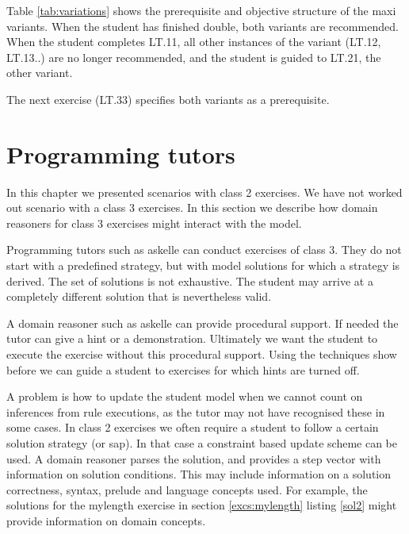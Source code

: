 Table \ref{tab:variations} shows the prerequisite and objective structure of the maxi variants.
When the student has finished double, both variants are recommended.
When the student completes LT.11, all other instances of the variant (LT.12, LT.13..) 
are no longer recommended, and the student is guided to LT.21, the other variant.

The next exercise (LT.33) specifies both variants as a prerequisite.




\section{Programming tutors}
\label{progtut}

In this chapter we presented scenarios with class 2 exercises.
We have not worked out scenario with a class 3 exercises.
In this section we describe how domain reasoners for class 3 exercises might interact with the model.

Programming tutors such as \gls{askelle} can conduct exercises of class 3.
They do not start with a predefined strategy, but with model solutions for which a strategy is derived.
The set of solutions is not exhaustive. 
The student may arrive at a completely different solution that is nevertheless valid.

A domain reasoner such as  \gls{askelle} can provide procedural support.
If needed the tutor can give a hint or a demonstration.
Ultimately we want the student to execute the exercise without this procedural support.
Using the techniques show before we can guide a student to exercises for which hints are turned off.

A problem is how to update the student model when we cannot count on inferences from  rule executions, as the tutor may not have recognised these in some cases.
In class 2 exercises we often require a student to follow a certain solution strategy (or \gls{sap}).
In that case a constraint based update scheme can be used.
A domain reasoner parses the solution, and provides a step vector with information on solution conditions.
This may include information on a solution correctness, syntax, prelude and language concepts used.
For example, the solutions for the mylength exercise in section \ref{excs:mylength}  listing  \ref{sol2} might provide information on domain concepts.

